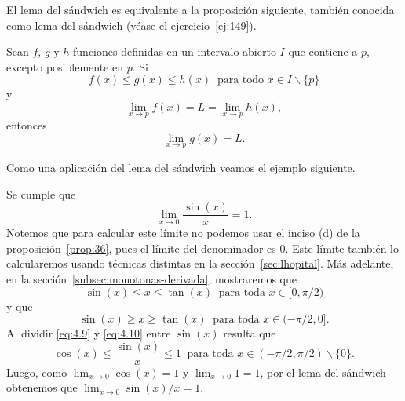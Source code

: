\documentclass[12pt,a4paper]{book}
\begin{document}
    El lema del sándwich es equivalente a la proposición siguiente, también
    conocida como lema del sándwich (véase el ejercicio~\ref{ej:149}).

    \begin{proposicion}\label{prop:39}
        Sean $f$, $g$ y $h$ funciones
        definidas en un intervalo abierto $I$ que contiene a $p$, excepto posiblemente
        en $p$. Si
        \begin{equation*}
            f(x)\leq g(x)\leq h(x)\ \text{ para todo }x\in I\backslash\{p\}
        \end{equation*}
        y
        \begin{equation*}
            \lim_{x\to p}f(x)=L=\lim_{x\to p}h(x),
        \end{equation*}
        entonces
        \begin{equation*}
            \lim_{x\to p}g(x)=L.
        \end{equation*}
    \end{proposicion}

    Como una aplicación del lema del sándwich veamos el ejemplo siguiente.

    \begin{ejemplo}\label{ejm:53}
        Se cumple que
        \begin{equation*}
            \lim_{x\to 0}\frac{\sin(x)}{x}=1.
        \end{equation*}
        Notemos que para calcular este límite no podemos usar el inciso (d) de la
        proposición~\ref{prop:36}, pues el límite del denominador es $0$. Este límite también lo
        calcularemos usando técnicas distintas en la sección~\ref{sec:lhopital}. Más adelante, en la
        sección~\ref{subsec:monotonas-derivada}, mostraremos que
        \begin{equation}\label{eq:4.9}
            \sin(x)\leq x\leq\tan(x)\ \text{ para toda }x\in[0,\pi/2)
        \end{equation}
        y que
        \begin{equation}\label{eq:4.10}
            \sin(x)\geq x\geq\tan(x)\ \text{ para toda }x\in(-\pi/2,0].
        \end{equation}
        Al dividir \eqref{eq:4.9} y \eqref{eq:4.10} entre $\sin(x)$ resulta que
        \begin{equation*}
            \cos(x)\leq\frac{\sin(x)}{x}\leq 1\ \text{ para toda }x\in(-\pi/2,\pi/2)\backslash\{0\}.
        \end{equation*}
        Luego, como $\lim_{x\to 0}\cos(x)=1$ y $\lim_{x\to 0}1=1$, por el lema del sándwich
        obtenemos que $\lim_{x\to 0}\sin(x)/x=1$.
    \end{ejemplo}
\end{document}

